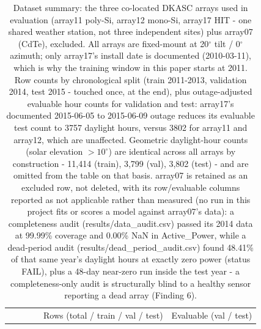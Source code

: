 \begin{table}[t]
  \centering
  \scriptsize
  \caption{Dataset summary: the three co-located DKASC arrays used in evaluation (array11 poly-Si, array12 mono-Si, array17 HIT - one shared weather station, not three independent sites) plus array07 (CdTe), excluded. All arrays are fixed-mount at 20$^\circ$ tilt / 0$^\circ$ azimuth; only array17's install date is documented (2010-03-11), which is why the training window in this paper starts at 2011. Row counts by chronological split (train 2011-2013, validation 2014, test 2015 - touched once, at the end), plus outage-adjusted evaluable hour counts for validation and test: array17's documented 2015-06-05 to 2015-06-09 outage reduces its evaluable test count to 3757 daylight hours, versus 3802 for array11 and array12, which are unaffected. Geometric daylight-hour counts (solar elevation $>10^\circ$) are identical across all arrays by construction - 11,414 (train), 3,799 (val), 3,802 (test) - and are omitted from the table on that basis. array07 is retained as an excluded row, not deleted, with its row/evaluable columns reported as not applicable rather than measured (no run in this project fits or scores a model against array07's data): a completeness audit (results/data\_audit.csv) passed its 2014 data at 99.99\% coverage and 0.00\% NaN in Active\_Power, while a dead-period audit (results/dead\_period\_audit.csv) found 48.41\% of that same year's daylight hours at exactly zero power (status FAIL), plus a 48-day near-zero run inside the test year - a completeness-only audit is structurally blind to a healthy sensor reporting a dead array (Finding 6).}
  \label{tab:T1}
  \begin{tabular}{llll rrrr rr}
    \toprule
    & & & & \multicolumn{4}{c}{Rows (total / train / val / test)} & \multicolumn{2}{c}{Evaluable (val / test)} \\

\end{tabular}
\end{table}
